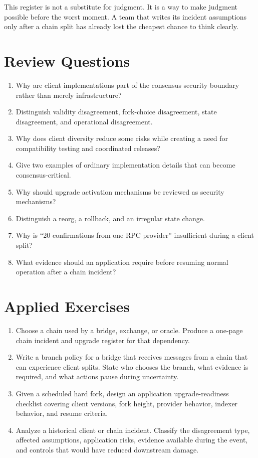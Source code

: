 This register is not a substitute for judgment. It is a way to make judgment possible before the worst moment. A team that writes its incident assumptions only after a chain split has already lost the cheapest chance to think clearly.

\section*{Review Questions}

\begin{enumerate}
\item Why are client implementations part of the consensus security boundary rather than merely infrastructure?
\item Distinguish validity disagreement, fork-choice disagreement, state disagreement, and operational disagreement.
\item Why does client diversity reduce some risks while creating a need for compatibility testing and coordinated releases?
\item Give two examples of ordinary implementation details that can become consensus-critical.
\item Why should upgrade activation mechanisms be reviewed as security mechanisms?
\item Distinguish a reorg, a rollback, and an irregular state change.
\item Why is ``20 confirmations from one RPC provider'' insufficient during a client split?
\item What evidence should an application require before resuming normal operation after a chain incident?
\end{enumerate}

\section*{Applied Exercises}

\begin{enumerate}
\item Choose a chain used by a bridge, exchange, or oracle. Produce a one-page chain incident and upgrade register for that dependency.
\item Write a branch policy for a bridge that receives messages from a chain that can experience client splits. State who chooses the branch, what evidence is required, and what actions pause during uncertainty.
\item Given a scheduled hard fork, design an application upgrade-readiness checklist covering client versions, fork height, provider behavior, indexer behavior, and resume criteria.
\item Analyze a historical client or chain incident. Classify the disagreement type, affected assumptions, application risks, evidence available during the event, and controls that would have reduced downstream damage.
\end{enumerate}
